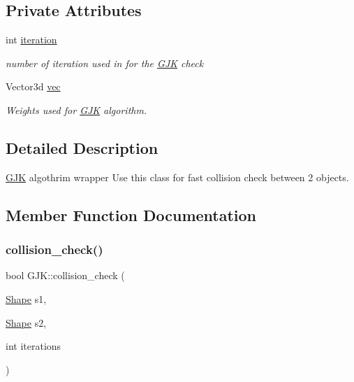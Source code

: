 \subsection*{Private Attributes}
\begin{DoxyCompactItemize}
\item 
\mbox{\label{classGJK_a06667bbfe53b1124831d25da58090a01}} 
int \hyperlink{classGJK_a06667bbfe53b1124831d25da58090a01}{iteration}
\begin{DoxyCompactList}\small\item\em number of iteration used in for the \hyperlink{classGJK}{G\+JK} check \end{DoxyCompactList}\item 
\mbox{\label{classGJK_afa9c1221d2268f946a11c2ed42de2acb}} 
Vector3d \hyperlink{classGJK_afa9c1221d2268f946a11c2ed42de2acb}{vec}
\begin{DoxyCompactList}\small\item\em Weights used for \hyperlink{classGJK}{G\+JK} algorithm. \end{DoxyCompactList}\end{DoxyCompactItemize}


\subsection{Detailed Description}
\hyperlink{classGJK}{G\+JK} algothrim wrapper Use this class for fast collision check between 2 objects. 

\subsection{Member Function Documentation}
\mbox{\label{classGJK_aa47f0a72a102236c96251951d5b98c78}} 
\subsubsection{\texorpdfstring{collision\+\_\+check()}{collision\_check()}}
{\footnotesize\ttfamily bool G\+J\+K\+::collision\+\_\+check (\begin{DoxyParamCaption}\item[{\hyperlink{structShape}{Shape}}]{s1,  }\item[{\hyperlink{structShape}{Shape}}]{s2,  }\item[{int}]{iterations }\end{DoxyParamCaption})}



